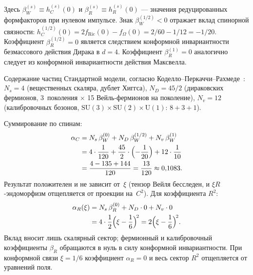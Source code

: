 \documentclass[12pt,a4paper]{article}
\theoremstyle{plain}
\theoremstyle{definition}
\begin{document}
\noindent
Здесь $\beta_W^{(s)} \equiv h_C^{(s)}(0)$ и
$\beta_R^{(s)} \equiv h_R^{(s)}(0)$ --- значения редуцированных
формфакторов при нулевом импульсе.  Знак $\beta_W^{(1/2)} < 0$ отражает
вклад спинорной связности: $h_C^{(1/2)}(0) = 2 f_{\mathrm{Ric}}(0)
- f_\Omega(0) = 2/60 - 1/12 = -1/20$.
Коэффициент $\beta_R^{(1/2)} = 0$ является следствием конформной
инвариантности безмассового действия Дирака в $d = 4$.
Коэффициент $\beta_R^{(1)} = 0$ аналогично следует из конформной
инвариантности действия Максвелла.

Содержание частиц Стандартной модели, согласно
Коделло--Перкаччи--Рахмеде~\cite{Codello:2008vh}:
$N_s = 4$ (вещественных скаляра, дублет Хиггса), $N_D = 45/2$
(дираковских фермионов, 3~поколения $\times$ 15 Вейль-фермионов
на поколение), $N_v = 12$ (калибровочных бозонов,
$\mathrm{SU}(3) \times \mathrm{SU}(2) \times \mathrm{U}(1)$:
$8 + 3 + 1$).

Суммирование по спинам:
\begin{align}
  \alpha_C &= N_s\,\beta_W^{(0)} + N_D\,\beta_W^{(1/2)}
    + N_v\,\beta_W^{(1)} \notag\\
  &= 4 \cdot \frac{1}{120} + \frac{45}{2} \cdot
    \Bigl(-\frac{1}{20}\Bigr) + 12 \cdot \frac{1}{10} \notag\\
  &= \frac{4 - 135 + 144}{120}
  = \frac{13}{120} \approx 0{,}1083.
  \label{eq:alpha_C_derivation}
\end{align}
Результат положителен и не зависит от~$\xi$ (тензор Вейля бесследен, и
$\xi R$-эндоморфизм отщепляется от проекции на~$C^2$).  Для коэффициента
$R^2$:
\begin{align}
  \alpha_R(\xi) &= N_s\,\beta_R^{(0)} + N_D \cdot 0 + N_v \cdot 0
  \notag\\
  &= 4 \cdot \frac{1}{2}\Bigl(\xi - \frac{1}{6}\Bigr)^{\!2}
  = 2\Bigl(\xi - \frac{1}{6}\Bigr)^{\!2}.
  \label{eq:alpha_R_derivation}
\end{align}
Вклад вносит лишь скалярный сектор; фермионный и калибровочный
коэффициенты $\beta_R$ обращаются в нуль в силу конформной инвариантности.
При конформной связи $\xi = 1/6$ коэффициент $\alpha_R = 0$ и весь
сектор $R^2$ отщепляется от уравнений поля.



\end{document}

